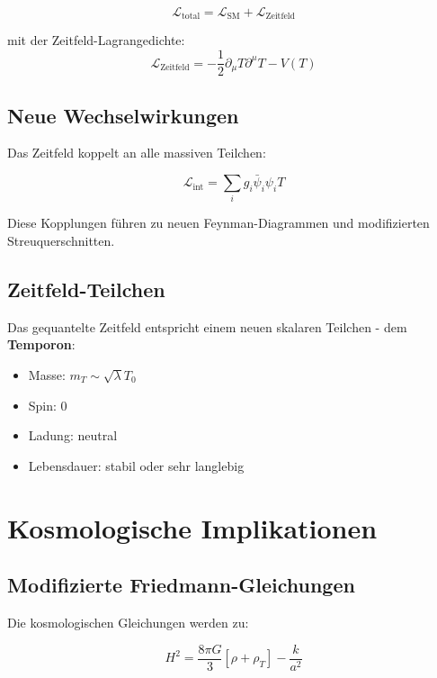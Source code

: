 \documentclass[12pt,a4paper]{report}
\begin{document}
	\begin{equation}
		\mathcal{L}_{\text{total}} = \mathcal{L}_{\text{SM}} + \mathcal{L}_{\text{Zeitfeld}}
	\end{equation}
	
	mit der Zeitfeld-Lagrangedichte:
	\begin{equation}
		\mathcal{L}_{\text{Zeitfeld}} = -\frac{1}{2}\partial_\mu T \partial^\mu T - V(T)
	\end{equation}
	
	\subsection{Neue Wechselwirkungen}
	
	Das Zeitfeld koppelt an alle massiven Teilchen:
	
	\begin{equation}
		\mathcal{L}_{\text{int}} = \sum_i g_i \bar{\psi}_i \psi_i T
	\end{equation}
	
	Diese Kopplungen führen zu neuen Feynman-Diagrammen und modifizierten Streuquerschnitten.
	
	\subsection{Zeitfeld-Teilchen}
	
	Das gequantelte Zeitfeld entspricht einem neuen skalaren Teilchen - dem \textbf{Temporon}:
	\begin{itemize}
		\item Masse: $m_T \sim \sqrt{\lambda}T_0$
		\item Spin: 0
		\item Ladung: neutral
		\item Lebensdauer: stabil oder sehr langlebig
	\end{itemize}
	
	\section{Kosmologische Implikationen}
	
	\subsection{Modifizierte Friedmann-Gleichungen}
	
	Die kosmologischen Gleichungen werden zu:
	
	\begin{equation}
		H^2 = \frac{8\pi G}{3}[\rho + \rho_T] - \frac{k}{a^2}
	\end{equation}
	
\end{document}
